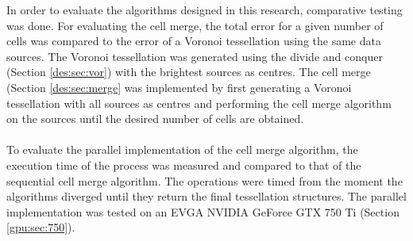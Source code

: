 In order to evaluate the algorithms designed in this research, comparative testing was done. For evaluating the cell merge, the total error for a given number of cells was compared to the error of a Voronoi tessellation using the same data sources. The Voronoi tessellation was generated using the divide and conquer (Section \ref{des:sec:vor}) with the brightest sources as centres. The cell merge (Section \ref{des:sec:merge} was implemented by first generating a Voronoi tessellation with all sources as centres and performing the cell merge algorithm on the sources until the desired number of cells are obtained.
\\
\\
To evaluate the parallel implementation of the cell merge algorithm, the execution time of the process was measured and compared to that of the sequential cell merge algorithm. The operations were timed from the moment the algorithms diverged until they return the final tessellation structures. The parallel implementation was tested on an EVGA NVIDIA GeForce GTX 750 Ti (Section \ref{gpu:sec:750}).